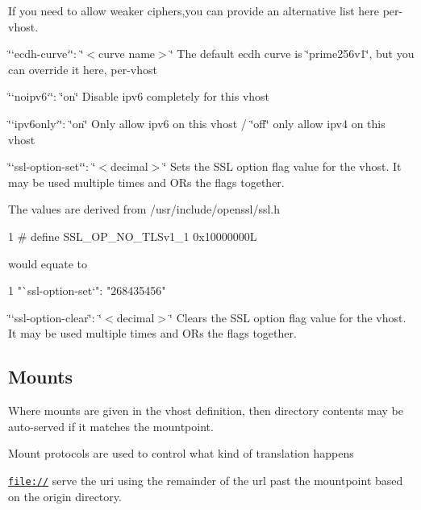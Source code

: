 If you need to allow weaker ciphers,you can provide an alternative list here per-\/vhost.


\begin{DoxyItemize}
\item \char`\"{}`ecdh-\/curve`\char`\"{}\+: \char`\"{}$<$curve name$>$\char`\"{} The default ecdh curve is \char`\"{}prime256v1\char`\"{}, but you can override it here, per-\/vhost
\item \char`\"{}`noipv6`\char`\"{}\+: \char`\"{}on\char`\"{} Disable ipv6 completely for this vhost
\item \char`\"{}`ipv6only`\char`\"{}\+: \char`\"{}on\char`\"{} Only allow ipv6 on this vhost / \char`\"{}off\char`\"{} only allow ipv4 on this vhost
\item \char`\"{}`ssl-\/option-\/set`\char`\"{}\+: \char`\"{}$<$decimal$>$\char`\"{} Sets the S\+SL option flag value for the vhost. It may be used multiple times and OR\textquotesingle{}s the flags together.
\end{DoxyItemize}

The values are derived from /usr/include/openssl/ssl.h 
\begin{DoxyCode}
1 # define SSL\_OP\_NO\_TLSv1\_1                               0x10000000L
\end{DoxyCode}


would equate to


\begin{DoxyCode}
1 "`ssl-option-set`": "268435456"
\end{DoxyCode}

\begin{DoxyItemize}
\item \char`\"{}`ssl-\/option-\/clear\textquotesingle{}\char`\"{}\+: \char`\"{}$<$decimal$>$\char`\"{} Clears the S\+SL option flag value for the vhost. It may be used multiple times and OR\textquotesingle{}s the flags together.
\end{DoxyItemize}

\subsection*{Mounts }

Where mounts are given in the vhost definition, then directory contents may be auto-\/served if it matches the mountpoint.

Mount protocols are used to control what kind of translation happens


\begin{DoxyItemize}
\item \href{file://}{\tt file\+://} serve the uri using the remainder of the url past the mountpoint based on the origin directory.
\end{DoxyItemize}

